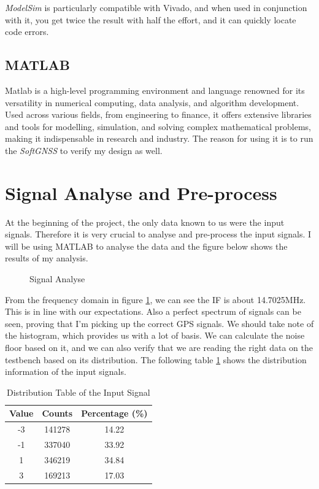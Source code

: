 \textit{ModelSim} is particularly compatible with Vivado, and when used in conjunction with it, you get twice the result with half the effort, and it can quickly locate code errors.

\subsection{MATLAB}
Matlab is a high-level programming environment and language renowned for its versatility in numerical computing, data analysis, and algorithm development. Used across various fields, from engineering to finance, it offers extensive libraries and tools for modelling, simulation, and solving complex mathematical problems, making it indispensable in research and industry. The reason for using it is to run the \textit{SoftGNSS} to verify my design as well.

\section{Signal Analyse and Pre-process}
At the beginning of the project, the only data known to us were the input signals. Therefore it is very crucial to analyse and pre-process the input signals. I will be using MATLAB to analyse the data and the figure below shows the results of my analysis.

\begin{figure}[!htbp]
    \centering
    
    \caption{Signal Analyse}
    \label{fig:sig_info}
\end{figure}

From the frequency domain in figure \ref{fig:sig_info}, we can see the IF is about 14.7025MHz. This is in line with our expectations. Also a perfect spectrum of signals can be seen, proving that I'm picking up the correct GPS signals. We should take note of the histogram, which provides us with a lot of basis. We can calculate the noise floor based on it, and we can also verify that we are reading the right data on the testbench based on its distribution. The following table \ref{tab:dis_sig} shows the distribution information of the input signals.

\begin{table}[!htbp]
\centering
\renewcommand\arraystretch{1.5}
\caption{Distribution Table of the Input Signal}
\label{tab:dis_sig}
\begin{tabular}{ccc}
    \toprule
    Value & Counts & Percentage (\%) \\
    \midrule
    -3 & \num{141278} & 14.22 \\
    -1 & \num{337040} & 33.92 \\
    1 & \num{346219} & 34.84 \\
    3 & \num{169213} & 17.03 \\
    \bottomrule
\end{tabular}
\end{table}

